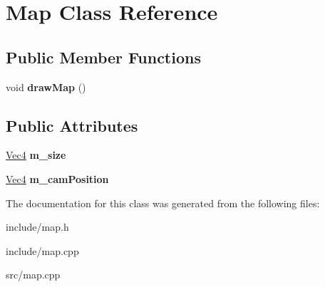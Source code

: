 \hypertarget{classMap}{
\section{Map Class Reference}
\label{classMap}
}
\subsection*{Public Member Functions}
\begin{DoxyCompactItemize}
\item 
\hypertarget{classMap_ae206cb92ab2c008e89fbc070dfcbd63e}{
void {\bfseries drawMap} ()}
\label{classMap_ae206cb92ab2c008e89fbc070dfcbd63e}

\end{DoxyCompactItemize}
\subsection*{Public Attributes}
\begin{DoxyCompactItemize}
\item 
\hypertarget{classMap_aa099c20064906d2e91c99fa87f34fa1b}{
\hyperlink{classVec4}{Vec4} {\bfseries m\_\-size}}
\label{classMap_aa099c20064906d2e91c99fa87f34fa1b}

\item 
\hypertarget{classMap_a143b41c3cc0529c94c8770b771c6bdd1}{
\hyperlink{classVec4}{Vec4} {\bfseries m\_\-camPosition}}
\label{classMap_a143b41c3cc0529c94c8770b771c6bdd1}

\end{DoxyCompactItemize}


The documentation for this class was generated from the following files:\begin{DoxyCompactItemize}
\item 
include/map.h\item 
include/map.cpp\item 
src/map.cpp\end{DoxyCompactItemize}
